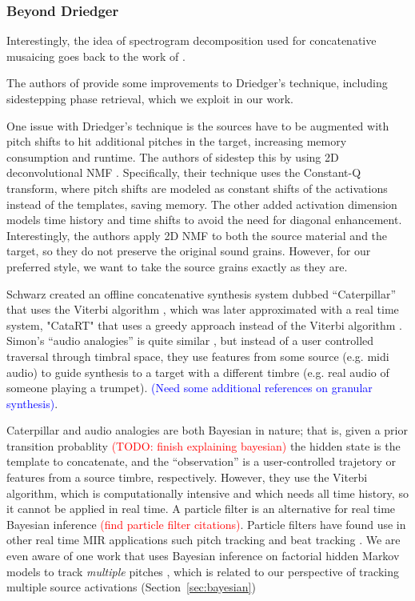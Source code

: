 \documentclass{article}
\newcommand{\ChrisEdit}[1]{\textcolor{red}{(#1)}}
\newcommand{\BenEdit}[1]{\textcolor{blue}{(#1)}}
\begin{document}
\subsubsection{Beyond Driedger}
Interestingly, the idea of spectrogram decomposition used for concatenative musaicing goes back to the work of \cite{burred2013cross}.

The authors of \cite{buch2017nichtnegativematrixfaktorisierungnutzendesklangsynthesensystem} provide some improvements to Driedger's technique, including sidestepping phase retrieval, which we exploit in our work.

One issue with Driedger's technique is the sources have to be augmented with pitch shifts to hit additional pitches in the target, increasing memory consumption and runtime.  The authors of \cite{foroughmand2017multi, aarabi2018music} sidestep this by using 2D deconvolutional NMF \cite{schmidt2006nonnegative}.  Specifically, their technique uses the Constant-Q transform, where pitch shifts are modeled as constant shifts of the activations instead of the templates, saving memory.  The other added activation dimension models time history and time shifts to avoid the need for diagonal enhancement.  Interestingly, the authors apply 2D NMF to both the source material and the target, so they do not preserve the original sound grains.  However, for our preferred style, we want to take the source grains exactly as they are.



Schwarz created an offline concatenative synthesis system dubbed ``Caterpillar'' that uses the Viterbi algorithm \cite{schwarz2000system}, which was later approximated with a real time system, "CataRT" that uses a greedy approach instead of the Viterbi algorithm \cite{schwarz2006real, schwarz2008principles}.  Simon's ``audio analogies'' is quite similar \cite{simon2005audio}, but instead of a user controlled traversal through timbral space, they use features from some source (e.g. midi audio) to guide synthesis to a target with a different timbre (e.g. real audio of someone playing a trumpet).  \BenEdit{Need some additional references on granular synthesis}.

Caterpillar and audio analogies are both Bayesian in nature; that is, given a prior transition probablity \ChrisEdit{TODO: finish explaining bayesian} the hidden state is the template to concatenate, and the ``observation'' is a user-controlled trajetory or features from a source timbre, respectively.  However, they use the Viterbi algorithm, which is computationally intensive and which needs all time history, so it cannot be applied in real time.  A particle filter is an alternative for real time Bayesian inference \ChrisEdit{find particle filter citations}.  Particle filters have found use in other real time MIR applications such pitch tracking \cite{duan2011state} and beat tracking \cite{heydari2021don}.  We are even aware of one work that uses Bayesian inference on factorial hidden Markov models to track {\em multiple} pitches \cite{wohlmayr2010probabilistic}, which is related to our perspective of tracking multiple source activations (Section~\ref{sec:bayesian})
\end{document}
